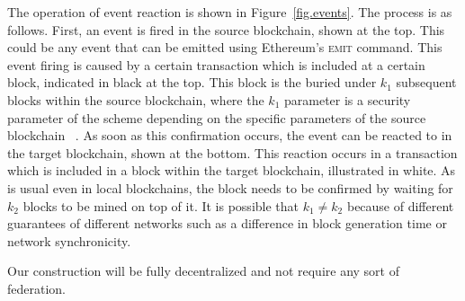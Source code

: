The operation of event reaction is shown in Figure~\ref{fig.events}. The process
is as follows. First, an event is fired in the source blockchain, shown at the
top. This could be any event that can be emitted using Ethereum's \textsc{emit}
command. This event firing is caused by a certain transaction which is included
at a certain block, indicated in black at the top. This block is the buried
under $k_1$ subsequent blocks within the source blockchain, where the $k_1$
parameter is a security parameter of the scheme depending on the specific
parameters of the source blockchain ~\cite{EC:GarKiaLeo15}. As soon as this
confirmation occurs, the event can be reacted to in the target blockchain, shown
at the bottom. This reaction occurs in a transaction which is included in a
block within the target blockchain, illustrated in white. As is usual even in
local blockchains, the block needs to be confirmed by waiting for $k_2$ blocks
to be mined on top of it. It is possible that $k_1 \neq k_2$ because of
different guarantees of different networks such as a difference in block
generation time or network synchronicity.

Our construction will be fully decentralized and not require any sort of
federation.
